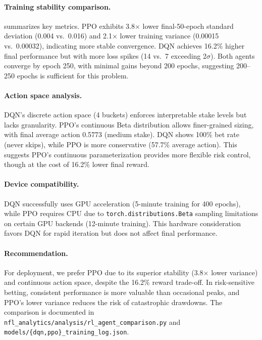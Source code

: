 \paragraph{Training stability comparison.}  summarizes key metrics. PPO exhibits 3.8$\times$ lower final-50-epoch standard deviation (0.004 vs.\ 0.016) and 2.1$\times$ lower training variance (0.00015 vs.\ 0.00032), indicating more stable convergence. DQN achieves 16.2\% higher final performance but with more loss spikes (14 vs.\ 7 exceeding 2$\sigma$). Both agents converge by epoch 250, with minimal gains beyond 200 epochs, suggesting 200--250 epochs is sufficient for this problem.

\paragraph{Action space analysis.} DQN's discrete action space (4 buckets) enforces interpretable stake levels but lacks granularity. PPO's continuous Beta distribution allows finer-grained sizing, with final average action 0.5773 (medium stake). DQN shows 100\% bet rate (never skips), while PPO is more conservative (57.7\% average action). This suggests PPO's continuous parameterization provides more flexible risk control, though at the cost of 16.2\% lower final reward.

\paragraph{Device compatibility.} DQN successfully uses GPU acceleration (5-minute training for 400 epochs), while PPO requires CPU due to \texttt{torch.distributions.Beta} sampling limitations on certain GPU backends (12-minute training). This hardware consideration favors DQN for rapid iteration but does not affect final performance.

\paragraph{Recommendation.} For deployment, we prefer PPO due to its superior stability (3.8$\times$ lower variance) and continuous action space, despite the 16.2\% reward trade-off. In risk-sensitive betting, consistent performance is more valuable than occasional peaks, and PPO's lower variance reduces the risk of catastrophic drawdowns. The comparison is documented in \texttt{nfl\_analytics/analysis/rl\_agent\_comparison.py} and \texttt{models/\{dqn,ppo\}\_training\_log.json}.

